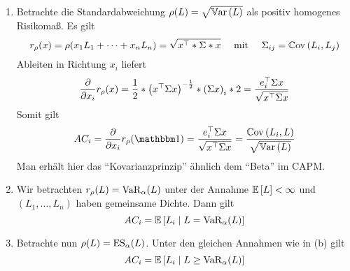 \begin{*beispiel}
	\begin{enumerate}[label=(\alph*), leftmargin=*]
		\item Betrachte die Standardabweichung $\rho(L) = \sqrt{\Var[L]}$ als positiv homogenes Risikomaß. Es gilt
		\begin{equation*}
			r_\rho(x) = \rho(x_1 L_1 + \dots + x_n L_n) = \sqrt{\trans{x} * \Sigma * x} \quad \mit \quad \Sigma_{ij} = \Cov{L_i}{L_j} 
		\end{equation*}
		Ableiten in Richtung $x_i$ liefert
		\begin{equation*}
			\partdiff{x_i} r_\rho(x) = \frac{1}{2} * \brackets{\trans{x} \Sigma  x}^{-\frac{1}{2}} * \brackets{\Sigma x}_i * 2 = \frac{\trans{e_i} \Sigma x}{\sqrt{\trans{x} \Sigma x}}
		\end{equation*}
		Somit gilt 
		\begin{equation*}
			AC_i = \partdiff{x_i} r_\rho(\one) = \frac{\trans{e_i} \Sigma x}{\sqrt{\trans{x} \Sigma x}} = \frac{\Cov{L_i}{L}}{\sqrt{\Var[L]}}
		\end{equation*}
		Man erhält hier das \enquote{Kovarianzprinzip} ähnlich dem \enquote{Beta} im CAPM.
		\item Wir betrachten $r_\rho(L) = \VaR_\alpha(L)$ unter der Annahme $\EW[L] < \infty$ und $(L_1, \dots, L_n)$ haben gemeinsame Dichte. Dann gilt 
		\begin{equation*}
			AC_i = \EW[L_i \mid L = \VaR_\alpha(L)]
		\end{equation*}
		\item Betrachte nun $\rho(L) = \ES_\alpha(L)$. Unter den gleichen Annahmen wie in (b) gilt
		\begin{equation*}
			AC_i = \EW[L_i \mid L \ge \VaR_\alpha(L)]
		\end{equation*}
	\end{enumerate}
\end{*beispiel}